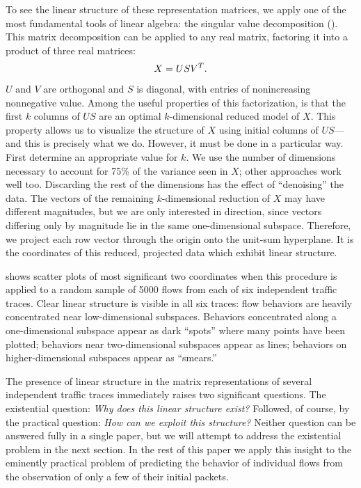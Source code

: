 \documentclass{acm_proc_article-sp}
\begin{document}
To see the linear structure of these representation matrices, we apply one of the most fundamental tools of linear algebra:
the singular value decomposition ().
This matrix decomposition can be applied to any real matrix, factoring it into a product of three real matrices:
\begin{align}
  X = US{V}^T.
\end{align}
$U$ and $V$ are orthogonal and $S$ is diagonal, with entries of nonincreasing nonnegative value.
Among the useful properties of this factorization, is that the first $k$ columns of $US$ are an optimal $k$-dimensional reduced model of $X$.\svdnote
This property allows us to visualize the structure of $X$ using initial columns of $US$---and this is precisely what we do.
However, it must be done in a particular way.
First determine an appropriate value for $k$.
We use the number of dimensions necessary to account for 75\% of the variance seen in $X$;
other approaches work well too.
Discarding the rest of the dimensions has the effect of ``denoising'' the data.
The vectors of the remaining $k$-dimensional reduction of $X$ may have different magnitudes, but we are only interested in direction, since vectors differing only by magnitude lie in the same one-dimensional subspace.
Therefore, we project each row vector through the origin onto the unit-sum hyperplane.\projectionnote
It is the coordinates of this reduced, projected data which exhibit linear structure.

 shows scatter plots of most significant two coordinates when this procedure is applied to a random sample of 5000 flows from each of six independent traffic traces.
Clear linear structure is visible in all six traces:
flow behaviors are heavily concentrated near low-dimensional subspaces.
Behaviors concentrated along a one-dimensional subspace appear as dark ``spots'' where many points have been plotted;
behaviors near two-dimensional subspaces appear as lines;
behaviors on higher-dimensional subspaces appear as ``smears.''

The presence of linear structure in the matrix representations of several independent traffic traces immediately raises two significant questions.
The existential question: \emph{Why does this linear structure exist?}
Followed, of course, by the practical question: \emph{How can we exploit this structure?}
Neither question can be answered fully in a single paper, but we will attempt to address the existential problem in the next section.
In the rest of this paper we apply this insight to the eminently practical problem of predicting the behavior of individual flows from the observation of only a few of their initial packets.
\end{document}
